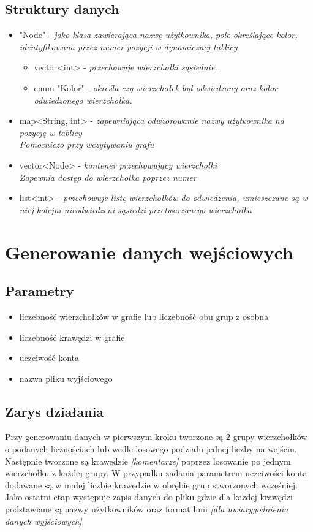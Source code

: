 \documentclass[11pt]{article}
\newcommand{\+}{\discretionary{\mbox{\scriptsize$\hookleftarrow$}}{}{}}
\begin{document}
\subsection{Struktury danych}
\begin{itemize}
\item
"Node" - \textsl{jako klasa zawierająca nazwę użytkownika, pole określające kolor, identyfikowana przez numer pozycji w dynamicznej tablicy}
\begin{itemize}[\textsl{W Node} :]
\item
vector<int> - \textsl{przechowuje wierzchołki sąsiednie.}
\item
enum "Kolor" - \textsl{określa czy wierzchołek był odwiedzony oraz kolor odwiedzonego wierzchołka.}
\end{itemize}
\item
map<String, int> - \textsl{zapewniająca odwzorowanie nazwy użytkownika na pozycję w tablicy} \\ 
\textsl{Pomocniczo przy wczytywaniu grafu}
\item
vector<Node> - \textsl{kontener przechowujący wierzchołki}\\ 
\textsl{Zapewnia dostęp do wierzchołka poprzez numer} 
\item 
list<int> - \textsl{przechowuje listę wierzchołków do odwiedzenia, umieszczane są w niej kolejni nieodwiedzeni sąsiedzi przetwarzanego wierzchołka}
\end{itemize}
\section{Generowanie danych wejściowych}
\subsection{Parametry}
\begin{itemize}
\item
liczebność wierzchołków w grafie lub liczebność obu grup z osobna
\item
liczebność krawędzi w grafie
\item
uczciwość konta
\item
nazwa pliku wyjściowego
\end{itemize}
\subsection{Zarys działania}
  Przy generowaniu danych w pierwszym kroku tworzone są 2 grupy wierzchołków o podanych licznościach lub wedle losowego podziału jednej liczby na wejściu. Następnie tworzone są krawędzie \textsl{[komentarze]} poprzez losowanie po jednym wierzchołku z każdej grupy. W przypadku zadania parametrem uczciwości konta dodawane są w małej liczbie krawędzie w obrębie grup stworzonych wcześniej. Jako ostatni etap występuje zapis danych do pliku gdzie dla każdej krawędzi podstawiane są nazwy użytkowników oraz format linii \textsl{[dla uwiarygodnienia danych wyjściowych]}.\\
\end{document}
